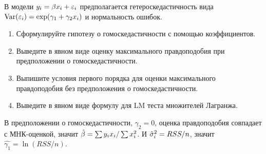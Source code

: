 \begin{problem}
В модели $y_i=\beta x_i+\varepsilon_i$ предполагается гетероскедастичность вида $\operatorname{Var}(\varepsilon_i)=\exp(\gamma_1+\gamma_2 x_i)$ и нормальность ошибок.
\begin{enumerate}
\item Сформулируйте гипотезу о гомоскедастичности с помощью коэффициентов.
\item Выведите в явном виде оценку максимального правдоподобия при предположении о гомоскедастичности.
\item Выпишите условия первого порядка для оценки максимального правдоподобия без предположения о гомоскедастичности.
\item Выведите в явном виде формулу для LM теста множителей Лагранжа.
\end{enumerate}


\begin{sol}
В предположении о гомоскедастичности, $\gamma_2=0$, оценка правдоподобия совпадает с МНК-оценкой, значит $\hat{\beta}=\sum y_i x_i/ \sum x_i^2$. И $\hat{\sigma}^2_i=RSS/n$, значит $\hat{\gamma_1}=\ln(RSS/n)$.
\end{sol}
\end{problem}



